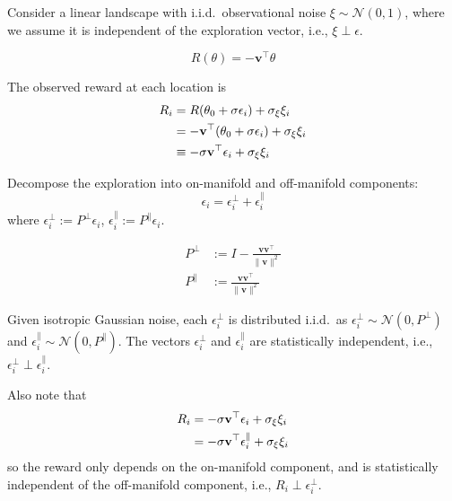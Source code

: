     Consider a linear landscape with i.i.d.~observational noise $\xi\sim\mathcal{N}(0,1)$,
    where we assume it is independent of the exploration vector, i.e., $\xi\perp\epsilon$.
    
    \begin{equation}
    R(\theta) = -\mathbf{v}^{\top}\theta
    \end{equation}
    
    The observed reward at each location is
    \begin{align}
    R_{i} &= R(\theta_{0}+\sigma\epsilon_{i})+\sigma_{\xi}\xi_{i} \notag\\
    &= -\mathbf{v}^{\top}(\theta_{0}+\sigma\epsilon_{i})+\sigma_{\xi}\xi_{i} \notag\\
    &\equiv -\sigma\mathbf{v}^{\top}\epsilon_{i} + \sigma_{\xi}\xi_{i}
    \end{align}
    
    Decompose the exploration into on-manifold and off-manifold components:
    \begin{equation}
    \epsilon_{i} = \epsilon_{i}^{\perp} + \epsilon_{i}^{\parallel}
    \end{equation}
    where $\epsilon_{i}^{\perp} := P^{\perp}\epsilon_{i}$, $\epsilon_{i}^{\parallel} := P^{\parallel}\epsilon_{i}$.
    
    \begin{align}
    P^{\perp} & := I - \frac{\mathbf{v}\mathbf{v}^{\top}}{\|\mathbf{v}\|^{2}} \\
    P^{\parallel} & := \frac{\mathbf{v}\mathbf{v}^{\top}}{\|\mathbf{v}\|^{2}}
    \end{align}
    
    Given isotropic Gaussian noise, each $\epsilon_{i}^{\perp}$ is distributed
    i.i.d.~as $\epsilon_{i}^{\perp}\sim\mathcal{N}(0, P^{\perp})$ and $\epsilon_{i}^{\parallel}\sim\mathcal{N}(0, P^{\parallel})$.
    The vectors $\epsilon_{i}^{\perp}$ and $\epsilon_{i}^{\parallel}$ are statistically
    independent, i.e., $\epsilon_{i}^{\perp}\perp\epsilon_{i}^{\parallel}$.
    
    Also note that
    \begin{align}
    R_{i} &= -\sigma\mathbf{v}^{\top}\epsilon_{i}+\sigma_{\xi}\xi_{i} \notag\\
    &= -\sigma\mathbf{v}^{\top}\epsilon_{i}^{\parallel}+\sigma_{\xi}\xi_{i}
    \end{align}
    so the reward only depends on the on-manifold component, and is statistically
    independent of the off-manifold component, i.e., $R_{i}\perp\epsilon_{i}^{\perp}$.
    
